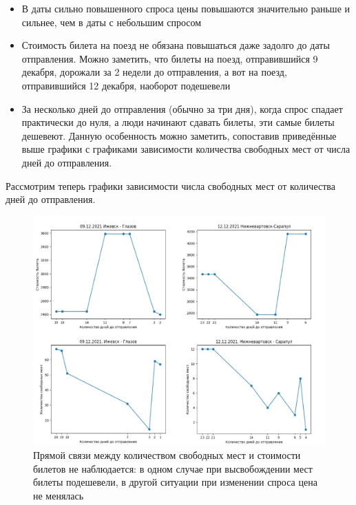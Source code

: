 \documentclass[conference]{IEEEtran}
\begin{document}
\begin{itemize}
	\item В даты сильно повышенного спроса цены повышаются значительно раньше и сильнее, чем в даты с небольшим спросом
	
	\item Стоимость билета на поезд не обязана повышаться даже задолго до даты отправления. Можно заметить, что билеты на поезд, отправившийся 9 декабря, дорожали за 2 недели до отправления, а вот на поезд, отправившийся 12 декабря, наоборот подешевели
	
	\item За несколько дней до отправления (обычно за три дня), когда спрос спадает практически до нуля, а люди начинают сдавать билеты, эти самые билеты дешевеют. Данную особенность можно заметить, сопоставив приведённые выше графики с графиками зависимости количества свободных мест от числа дней до отправления.
\end{itemize}

Рассмотрим теперь графики зависимости числа свободных мест от количества дней до отправления.

\begin{figure}[h!]
	\includegraphics[scale=0.25]{4pict}
	\caption{Прямой связи между количеством свободных мест и стоимости билетов не наблюдается: в одном случае при высвобождении мест билеты подешевели, в другой ситуации при изменении спроса цена не менялась}
\end{figure}
\end{document}
